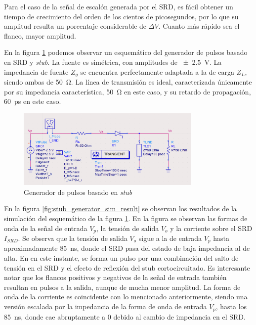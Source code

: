 Para el caso de la señal de escalón generada por el SRD, es fácil obtener un
tiempo de crecimiento del orden de los cientos de picosegundos, por lo que su
amplitud resulta un porcentaje considerable de $\Delta V$. Cuanto más rápido sea
el flanco, mayor amplitud.

En la figura \ref{fig:stub_generator_circuit} podemos observar un esquemático
del generador de pulsos basado en SRD y \textit{stub}. La fuente es simétrica,
con amplitudes de \qty{\pm 2.5}{\volt}. La impedancia de fuente $Z_g$ se
encuentra perfectamente adaptada a la de carga $Z_L$, siendo ambas de
\qty{50}{\ohm}. La línea de transmisión es ideal, caracterizada únicamente por
su impedancia característica, \qty{50}{\ohm} en este caso, y su retardo de
propagación, \qty{60}{\pico\second} en este caso.

\begin{figure}[t!]
    \centering
    \includegraphics[width=0.8\textwidth]{images/stub_generator_circuit.png}
    \caption{Generador de pulsos basado en \textit{stub}}
    \label{fig:stub_generator_circuit}
\end{figure}

En la figura \ref{fig:stub_generator_sim_result} se observan los resultados de
la simulación del esquemático de la figura \ref{fig:stub_generator_circuit}. En
la figura  se observan las formas de onda de la señal de entrada $V_p$, la
tensión de salida $V_o$ y la corriente sobre el SRD $I_{SRD}$. Se observa que la
tensión de salida $V_o$ sigue a la de entrada $V_p$ hasta aproximadamente
\qty{85}{\nano\second}, donde el SRD pasa del estado de baja impedancia al de
alta. En en este instante, se forma un pulso por una combinación del salto de
tensión en el SRD y el efecto de reflexión del stub cortocircuitado. Es
interesante notar que los flancos positivos y negativos de la señal de entrada
también resultan en pulsos a la salida, aunque de mucha menor amplitud. La forma
de onda de la corriente es coincidente con lo mencionado anteriormente, siendo
una versión escalada por la impedancia de la forma de onda de entrada $V_p$,
hasta los \qty{85}{\nano\second}, donde cae abruptamente a $0$ debido al cambio
de impedancia en el SRD.

